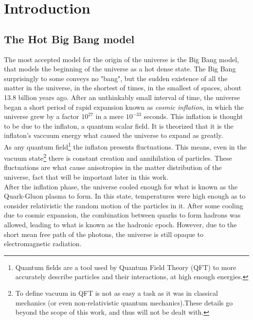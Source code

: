 \chapter{Introduction}

\section{The Hot Big Bang model}

The most accepted model for the origin of the universe is the Big Bang model, that models the beginning of the universe as a hot dense state. The Big Bang surprisingly to some conveys no "bang", but the sudden existence of all the matter in the universe, in the shortest of times, in the smallest of spaces, about 13.8 billion years ago. After an unthinkably small interval of time, the universe began a short period of rapid expansion known as \textit{cosmic inflation}, in which the universe grew by a factor $10^{27}$ in a mere $10^{-33}$ seconds. This inflation is thought to be due to the inflaton, a quantum scalar field. It is theorized that it is the inflaton's vaccuum energy what caused the universe to expand as greatly. \\

As any quantum field\footnote{Quantum fields are a tool used by Quantum Field Theory (QFT) to more accurately describe particles and their interactions, at high enough energies.} the inflaton presents fluctuations. This means, even in the vacuum state\footnote{To define vacuum in QFT is not as easy a task as it was in classical mechanics (or even non-relativistic quantum mechanics).These details go beyond the scope of this work, and thus will not be dealt with.} there is constant creation and annihilation of particles. These fluctuations are what cause anisotropies in the matter distribution of the universe, fact that will be important later in this work. \\

After the inflation phase, the universe cooled enough for what is known as the Quark-Gluon plasma to form. In this state, temperatures were high enough as to consider relativistic the random motion of the particles in it. After some cooling due to cosmic expansion, the combination between quarks to form hadrons was allowed, leading to what is known as the hadronic epoch. However, due to the short mean free path of the photons, the universe is still opaque to electromagnetic radiation. \\

